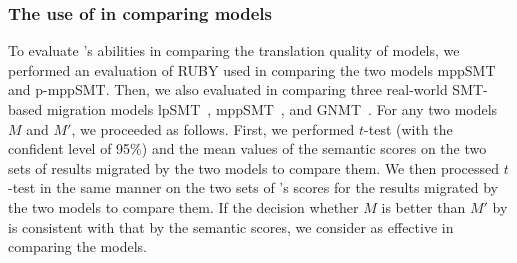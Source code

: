 \subsubsection{The use of {\model} in comparing models}
To evaluate {\model}'s abilities in comparing the translation quality
of models, we performed an evaluation of RUBY used in comparing
the two models mppSMT and p-mppSMT.
%
Then, we also evaluated {\model} in comparing three real-world
SMT-based migration models lpSMT~\cite{fse13}, mppSMT~\cite{ase15},
and GNMT~\cite{gnmt}.  
%
For any two models $M$ and $M'$, we proceeded as follows. First, we
performed $t$-test (with the confident level of 95\%) and the mean
values of the semantic scores on the two sets of results migrated by
the two models to compare them. We then processed $t$-test in the same
manner on the two sets of {\model}'s scores for the results migrated
by the two models to compare them. If the decision whether $M$ is
better than $M'$ by {\model} is consistent with that by the semantic
scores, we consider {\model} as effective in comparing the models.



